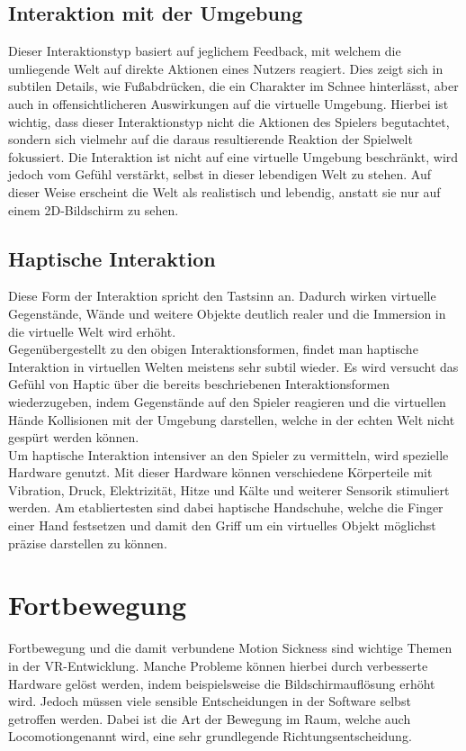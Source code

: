 \subsection{Interaktion mit der Umgebung}
Dieser Interaktionstyp basiert auf jeglichem Feedback, mit welchem die umliegende Welt auf direkte Aktionen eines Nutzers reagiert. Dies zeigt sich in subtilen Details, wie Fußabdrücken, die ein Charakter im Schnee hinterlässt, aber auch in offensichtlicheren Auswirkungen auf die virtuelle Umgebung. Hierbei ist wichtig, dass dieser Interaktionstyp nicht die Aktionen des Spielers begutachtet, sondern sich vielmehr auf die daraus resultierende Reaktion der Spielwelt fokussiert. Die Interaktion ist nicht auf eine virtuelle Umgebung beschränkt, wird jedoch vom Gefühl verstärkt, selbst in dieser lebendigen Welt zu stehen. Auf dieser Weise erscheint die Welt als realistisch und lebendig, anstatt sie nur auf einem 2D-Bildschirm zu sehen.
\newpage
\noindent
\subsection{Haptische Interaktion}
Diese Form der Interaktion spricht den Tastsinn an. Dadurch wirken virtuelle Gegenstände, Wände und weitere Objekte deutlich realer und die Immersion in die virtuelle Welt wird erhöht.\\
Gegenübergestellt zu den obigen Interaktionsformen, findet man haptische Interaktion in virtuellen Welten meistens sehr subtil wieder. Es wird versucht das Gefühl von Haptic über die bereits beschriebenen Interaktionsformen wiederzugeben, indem Gegenstände auf den Spieler reagieren und die virtuellen Hände Kollisionen mit der Umgebung darstellen, welche in der echten Welt nicht gespürt werden können.\\
Um haptische Interaktion intensiver an den Spieler zu vermitteln, wird spezielle Hardware genutzt. Mit dieser Hardware können verschiedene Körperteile mit Vibration, Druck, Elektrizität, Hitze und Kälte und weiterer Sensorik stimuliert werden. Am etabliertesten sind dabei haptische Handschuhe, welche die Finger einer Hand festsetzen und damit den Griff um ein virtuelles Objekt möglichst präzise darstellen zu können.


\section{Fortbewegung}
Fortbewegung und die damit verbundene Motion Sickness sind wichtige Themen in der VR-Entwicklung. Manche Probleme können hierbei durch verbesserte Hardware gelöst werden, indem beispielsweise die Bildschirmauflösung erhöht wird. Jedoch müssen viele sensible Entscheidungen in der Software selbst getroffen werden. Dabei ist die Art der Bewegung im Raum, welche auch \dq Locomotion\dq genannt wird, eine sehr grundlegende Richtungsentscheidung.

